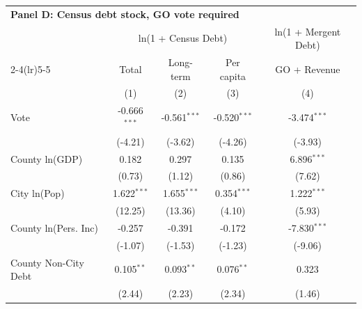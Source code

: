 \begingroup
\centering
\begin{tabular*}{\textwidth}{@{\extracolsep{\fill}}lcccc}
\multicolumn{5}{l}{\textbf{Panel D: Census debt stock, GO vote required}}\\

\addlinespace
   \toprule
                        & \multicolumn{3}{c}{ln(1 + Census Debt)} & \multicolumn{1}{c}{ln(1 + Mergent Debt)}\\  
   \cmidrule(lr){2-4}\cmidrule(lr){5-5}
                        & Total                     & Long-term                     & Per capita                           & GO + Revenue \\   
                        & (1)                       & (2)                           & (3)                                  & (4)\\  
   \midrule 
   Vote                 & -0.666$^{***}$            & -0.561$^{***}$                & -0.520$^{***}$                       & -3.474$^{***}$\\   
                        & (-4.21)                  & (-3.62)                      & (-4.26)                             & (-3.93)\\   
   County ln(GDP)       & 0.182                     & 0.297                         & 0.135                                & 6.896$^{***}$\\   
                        & (0.73)                   & (1.12)                       & (0.86)                              & (7.62)\\   
   City ln(Pop)         & 1.622$^{***}$             & 1.655$^{***}$                 & 0.354$^{***}$                        & 1.222$^{***}$\\   
                        & (12.25)                  & (13.36)                      & (4.10)                              & (5.93)\\   
   County ln(Pers. Inc) & -0.257                    & -0.391                        & -0.172                               & -7.830$^{***}$\\   
                        & (-1.07)                  & (-1.53)                      & (-1.23)                             & (-9.06)\\   
   County Non-City Debt & 0.105$^{**}$              & 0.093$^{**}$                  & 0.076$^{**}$                         & 0.323\\   
                        & (2.44)                   & (2.23)                       & (2.34)                              & (1.46)\\   

\end{tabular*}
